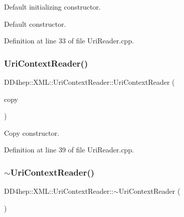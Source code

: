 Default initializing constructor. 

Default constructor. 

Definition at line 33 of file Uri\+Reader.\+cpp.

\hypertarget{class_d_d4hep_1_1_x_m_l_1_1_uri_context_reader_ae8808c053cfc81ddff19c1be89f95e6e}{}\label{class_d_d4hep_1_1_x_m_l_1_1_uri_context_reader_ae8808c053cfc81ddff19c1be89f95e6e} 
\subsubsection{\texorpdfstring{Uri\+Context\+Reader()}{UriContextReader()}\hspace{0.1cm}{\footnotesize\ttfamily [2/2]}}
{\footnotesize\ttfamily D\+D4hep\+::\+X\+M\+L\+::\+Uri\+Context\+Reader\+::\+Uri\+Context\+Reader (\begin{DoxyParamCaption}\item[{const \hyperlink{class_d_d4hep_1_1_x_m_l_1_1_uri_context_reader}{Uri\+Context\+Reader} \&}]{copy }\end{DoxyParamCaption})}



Copy constructor. 



Definition at line 39 of file Uri\+Reader.\+cpp.

\hypertarget{class_d_d4hep_1_1_x_m_l_1_1_uri_context_reader_a065124ec7d3af30801bf471ed4259690}{}\label{class_d_d4hep_1_1_x_m_l_1_1_uri_context_reader_a065124ec7d3af30801bf471ed4259690} 
\subsubsection{\texorpdfstring{$\sim$\+Uri\+Context\+Reader()}{~UriContextReader()}}
{\footnotesize\ttfamily D\+D4hep\+::\+X\+M\+L\+::\+Uri\+Context\+Reader\+::$\sim$\+Uri\+Context\+Reader (\begin{DoxyParamCaption}{ }\end{DoxyParamCaption})\hspace{0.3cm}{\ttfamily [virtual]}}



